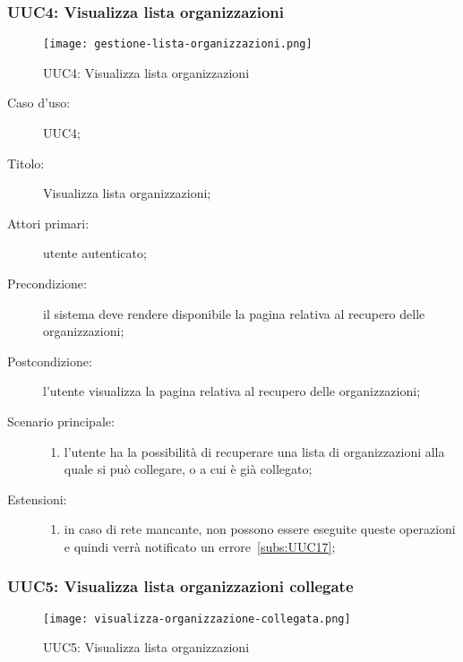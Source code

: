 \documentclass[../../../analisi-dei-requisiti.tex]{subfiles}
\begin{document}
\subsubsection{UUC4: Visualizza lista organizzazioni}%
\label{subs:UUC4}


\begin{figure}[H]
  \centering
  \texttt{[image: gestione-lista-organizzazioni.png]}
  \caption{UUC4: Visualizza lista organizzazioni}%
  \label{fig:UUC4}
\end{figure}

\begin{description}
  \item[Caso d’uso:] UUC4;
  \item[Titolo:] Visualizza lista organizzazioni;
  \item[Attori primari:] utente autenticato;
  \item[Precondizione:] il sistema deve rendere disponibile la pagina relativa al recupero delle organizzazioni;
  \item[Postcondizione:] l'utente visualizza la pagina relativa al recupero delle organizzazioni;
  \item[Scenario principale:]
        \begin{enumerate}
          \item l'utente ha la possibilità di recuperare una lista di organizzazioni alla quale si può collegare, o a cui è già collegato;
        \end{enumerate}
  \item[Estensioni:]
        \begin{enumerate}
          \item in caso di rete mancante, non possono essere eseguite queste operazioni e quindi verrà notificato un errore~\ref{subs:UUC17};
        \end{enumerate}
\end{description}



\subsubsection{UUC5: Visualizza lista organizzazioni collegate}%
\label{subs:UUC5}

\begin{figure}[H]
  \centering
  \texttt{[image:  visualizza-organizzazione-collegata.png]}
  \caption{UUC5: Visualizza lista organizzazioni}%
  \label{fig:UUC5}
\end{figure}
\end{document}
